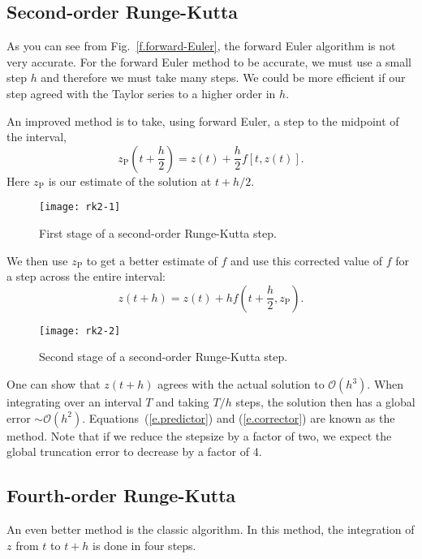\subsection{Second-order Runge-Kutta}

As you can see from Fig.~\ref{f.forward-Euler}, the forward Euler algorithm is not very accurate.
For the forward Euler method to be accurate, we must use a small step $h$ and therefore we must take many steps. We could be more efficient if our step agreed with the Taylor series to a higher order in $h$.

An improved method is to take, using forward Euler, a step to the midpoint of the interval,
\begin{equation}\label{e.predictor}
z_{\mathrm{P}}\left(t+\frac{h}{2}\right) = z(t) + \frac{h}{2}f[t,z(t)].
\end{equation}
Here $z_{\mathrm{P}}$ is our estimate of the solution at $t+h/2$.
\begin{figure}
\texttt{[image: rk2-1]}
\caption{First stage of a second-order Runge-Kutta step.}
\end{figure}

We then use $z_{\mathrm{P}}$ to get a better estimate of $f$ and use this corrected value of $f$ for a step across the entire interval:
\begin{equation}\label{e.corrector}
z(t+h) = z(t) + h f\left(t+\frac{h}{2},z_{\mathrm{P}}\right).
\end{equation}
\begin{figure}
\texttt{[image: rk2-2]}
\caption{Second stage of a second-order Runge-Kutta step.}
\end{figure}

One can show that $z(t+h)$ agrees with the actual solution to $\mathcal{O}(h^{3})$. When integrating over an interval $T$ and taking $T/h$ steps, the solution then has a global error $\sim\mathcal{O}(h^{2})$.  Equations~(\ref{e.predictor}) and (\ref{e.corrector}) are known as the  method. Note that if we reduce the stepsize by a factor of two, we expect the global truncation error to decrease by a factor of 4.

\subsection{Fourth-order Runge-Kutta}

An even better method is the classic  algorithm. In this method, the integration of $z$ from $t$ to $t+h$ is done in four steps. 

